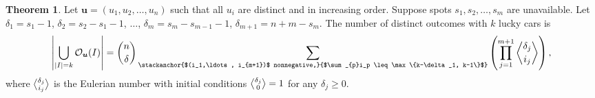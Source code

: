 \documentclass[reqno]{amsart}
\theoremstyle{definition}
\newtheorem{theorem}{Theorem}[section]
\theoremstyle{remark}
\newcommand{\out}{\mathcal{O}}
\newcommand{\bsy}{\boldsymbol}
\begin{document}
\begin{theorem}\label{thm:outcomes with m unavailable spots}
Let $\bsy{u}=(u_1,u_2,\ldots, u_n)$ such that all $u_i$ are distinct and in increasing order. Suppose spots $s_1,s_2,\ldots, s_m$ are unavailable. Let $\delta_1 = s_1-1$, $\delta_2 = s_2-s_1-1$, $\ldots$, $\delta_m = s_m-s_{m-1}-1$, $\delta_{m+1} = n+m - s_m$. The number of distinct outcomes with $k$ lucky cars is
\[
\left|\bigcup_{|I| = k}\out_{\bsy{u}}(I)\right|=\binom{n}{\delta}\sum_{\stackanchor{$(i_1,\ldots, i_{m+1})$ nonnegative,}{$\sum_{p}i_p \leq  \max\{k-\delta_1, k-1\}$}} \left( \prod_{j=1}^{m+1} \genfrac{\langle}{\rangle}{0pt}{}{\delta_j}{i_j}
\right),
\]
where 
$\genfrac{\langle}{\rangle}{0pt}{}{\delta_j}{i_j}$
is the Eulerian number with initial conditions $\genfrac{\langle}{\rangle}{0pt}{}{\delta_j}{0}=1$
for any $\delta_j\geq 0$.
\end{theorem}
\end{document}
